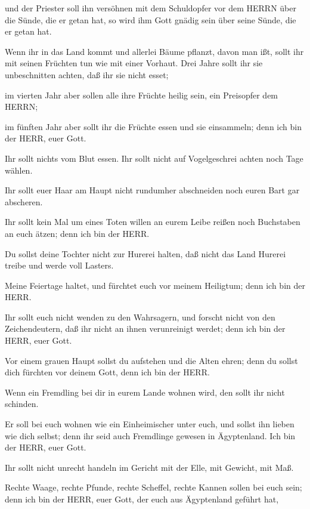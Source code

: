  und der Priester soll ihn versöhnen mit dem Schuldopfer
vor dem HERRN über die Sünde, die er getan hat, so wird ihm Gott gnädig
sein über seine Sünde, die er getan hat.

 Wenn ihr in das Land kommt und allerlei Bäume pflanzt,
davon man ißt, sollt ihr mit seinen Früchten tun wie mit einer Vorhaut.
Drei Jahre sollt ihr sie unbeschnitten achten, daß ihr sie nicht esset;

 im vierten Jahr aber sollen alle ihre Früchte heilig sein,
ein Preisopfer dem HERRN;

 im fünften Jahr aber sollt ihr die Früchte essen und sie
einsammeln; denn ich bin der HERR, euer Gott.

 Ihr sollt nichts vom Blut essen. Ihr sollt nicht auf
Vogelgeschrei achten noch Tage wählen.

 Ihr sollt euer Haar am Haupt nicht rundumher abschneiden
noch euren Bart gar abscheren.

 Ihr sollt kein Mal um eines Toten willen an eurem Leibe
reißen noch Buchstaben an euch ätzen; denn ich bin der HERR.

 Du sollst deine Tochter nicht zur Hurerei halten, daß
nicht das Land Hurerei treibe und werde voll Lasters.

 Meine Feiertage haltet, und fürchtet euch vor meinem
Heiligtum; denn ich bin der HERR.

 Ihr sollt euch nicht wenden zu den Wahrsagern, und forscht
nicht von den Zeichendeutern, daß ihr nicht an ihnen verunreinigt
werdet; denn ich bin der HERR, euer Gott.

 Vor einem grauen Haupt sollst du aufstehen und die Alten
ehren; denn du sollst dich fürchten vor deinem Gott, denn ich bin der
HERR.

 Wenn ein Fremdling bei dir in eurem Lande wohnen wird, den
sollt ihr nicht schinden.

 Er soll bei euch wohnen wie ein Einheimischer unter euch,
und sollst ihn lieben wie dich selbst; denn ihr seid auch Fremdlinge
gewesen in Ägyptenland. Ich bin der HERR, euer Gott.

 Ihr sollt nicht unrecht handeln im Gericht mit der Elle,
mit Gewicht, mit Maß.

 Rechte Waage, rechte Pfunde, rechte Scheffel, rechte
Kannen sollen bei euch sein; denn ich bin der HERR, euer Gott, der euch
aus Ägyptenland geführt hat,

